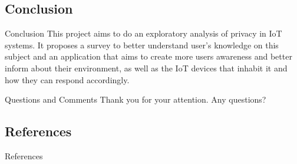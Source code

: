 \documentclass[xcolor={svgnames},aspectratio=169]{beamer}
\begin{document}
\subsection{Conclusion}

\begin{frame}{Conclusion}
    This project aims to do an exploratory analysis of privacy in
    IoT systems. It proposes a survey to better understand user's
    knowledge on this subject and an application that aims to
    create more users awareness and better inform about their
    environment, as well as the IoT devices that inhabit it and
    how they can respond accordingly.
\end{frame}

\begin{frame}{Questions and Comments}
    Thank you for your attention. Any questions?
\end{frame}

\subsection{References}

\begin{frame}[allowframebreaks]{References}
    
    
\end{frame}


\end{document}
